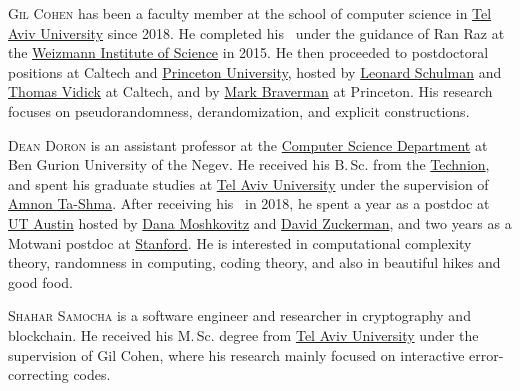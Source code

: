 \documentclass{toc}
\begin{document}
%
%
%
%
%
%
%
%
%
%
%
%
%
%
%
%
%
%
%
%
\begin{tocaboutauthors}
\begin{tocabout}[cohen]  %
\textsc{Gil Cohen} %
%
has been  %
a faculty member at the school of computer science in \href{http://tq.cs.tau.ac.il/}{Tel Aviv University} %
since 2018.  %
He completed his \phd\ under the guidance of Ran Raz at the \href{https://www.weizmann.ac.il/math/}{Weizmann Institute of Science} in 2015. He then proceeded to postdoctoral positions at Caltech and \href{https://theory.cs.princeton.edu/}{Princeton University}, hosted by \href{http://users.cms.caltech.edu/~schulman/}{Leonard Schulman} and \href{http://users.cms.caltech.edu/~vidick/}{Thomas Vidick} at Caltech, and by \href{https://mbraverm.princeton.edu/}{Mark Braverman} at Princeton. His research focuses on pseudorandomness, derandomization, and explicit constructions.
\end{tocabout}
\begin{tocabout}[doron]
  \textsc{Dean Doron} is an assistant professor at the \href{https://in.bgu.ac.il/en/natural_science/cs/Pages/default.aspx}{Computer Science Department} at Ben Gurion University of the Negev. He received his B.\,Sc. from the \href{https://www.cs.technion.ac.il/}{Technion}, and spent his graduate studies at \href{http://tq.cs.tau.ac.il/}{Tel Aviv University} under the supervision of \href{http://www.cs.tau.ac.il/~amnon/}{Amnon Ta-Shma}. After receiving his \phd\ in 2018, he spent a year as a postdoc %
at  %
\href{https://www.cs.utexas.edu/research/theoretical-computer-science}{UT Austin} hosted by \href{https://www.cs.utexas.edu/~danama/}{Dana Moshkovitz} and \href{https://www.cs.utexas.edu/~diz/}{David Zuckerman}, and two years as a Motwani postdoc at \href{https://theory.stanford.edu/main/index.shtml}{Stanford}. He is interested in computational complexity theory, randomness in computing, coding theory, and also in beautiful hikes and good food.
\end{tocabout}
\begin{tocabout}[samocha]
\textsc{Shahar Samocha} is a software engineer and researcher in cryptography and blockchain.
He received his M.\,Sc. degree from \href{http://tq.cs.tau.ac.il/}{Tel Aviv University} under the supervision of Gil Cohen, where his research mainly focused on interactive error-correcting codes.
\end{tocabout}
\end{tocaboutauthors}
\end{document}
